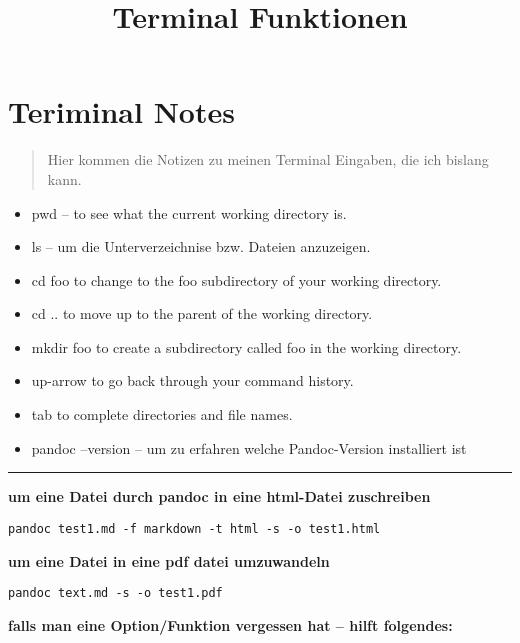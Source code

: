 \documentclass[]{article}
\title{Terminal Funktionen}
\author{}
\date{}
\begin{document}
\maketitle


{
\hypersetup{linkcolor=black}
\setcounter{tocdepth}{2}
\tableofcontents
}
\section{Teriminal Notes}\label{teriminal-notes}

\begin{quote}
Hier kommen die Notizen zu meinen Terminal Eingaben, die ich bislang
kann.
\end{quote}

\begin{itemize}
\itemsep1pt\parskip0pt
\item
  pwd -- to see what the current working directory is.
\item
  ls -- um die Unterverzeichnise bzw. Dateien anzuzeigen.
\item
  cd foo to change to the foo subdirectory of your working directory.
\item
  cd .. to move up to the parent of the working directory.
\item
  mkdir foo to create a subdirectory called foo in the working
  directory.
\item
  up-arrow to go back through your command history.
\item
  tab to complete directories and file names.
\item
  pandoc --version -- um zu erfahren welche Pandoc-Version installiert
  ist
\end{itemize}

\begin{center}\rule{0.5\linewidth}{\linethickness}\end{center}

\textbf{um eine Datei durch pandoc in eine html-Datei zuschreiben}

\begin{verbatim}
pandoc test1.md -f markdown -t html -s -o test1.html
\end{verbatim}

\textbf{um eine Datei in eine pdf datei umzuwandeln}

\begin{verbatim}
pandoc text.md -s -o test1.pdf
\end{verbatim}

\textbf{falls man eine Option/Funktion vergessen hat -- hilft
folgendes:}
\end{document}
